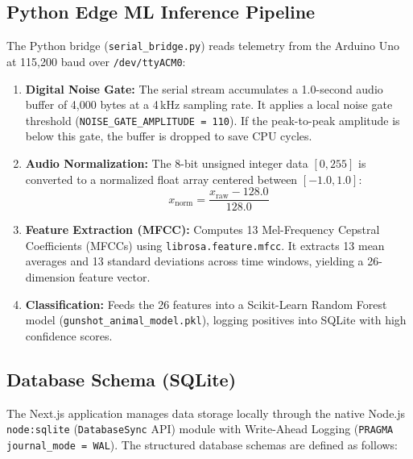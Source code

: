 \documentclass[11pt,a4paper]{article}
\begin{document}
\subsection{Python Edge ML Inference Pipeline}
The Python bridge (\texttt{serial\_bridge.py}) reads telemetry from the Arduino Uno at 115,200 baud over \texttt{/dev/ttyACM0}:
\begin{enumerate}
    \item \textbf{Digital Noise Gate:} The serial stream accumulates a 1.0-second audio buffer of 4,000 bytes at a 4\,kHz sampling rate. It applies a local noise gate threshold (\texttt{NOISE\_GATE\_AMPLITUDE = 110}). If the peak-to-peak amplitude is below this gate, the buffer is dropped to save CPU cycles.
    \item \textbf{Audio Normalization:} The 8-bit unsigned integer data $[0, 255]$ is converted to a normalized float array centered between $[-1.0, 1.0]$:
        \begin{equation}
            x_{\text{norm}} = \frac{x_{\text{raw}} - 128.0}{128.0}
        \end{equation}
    \item \textbf{Feature Extraction (MFCC):} Computes 13 Mel-Frequency Cepstral Coefficients (MFCCs) using \texttt{librosa.feature.mfcc}. It extracts 13 mean averages and 13 standard deviations across time windows, yielding a 26-dimension feature vector.
    \item \textbf{Classification:} Feeds the 26 features into a Scikit-Learn Random Forest model (\texttt{gunshot\_animal\_model.pkl}), logging positives into SQLite with high confidence scores.
\end{enumerate}

\subsection{Database Schema (SQLite)}
The Next.js application manages data storage locally through the native Node.js \texttt{node:sqlite} (\texttt{DatabaseSync} API) module with Write-Ahead Logging (\texttt{PRAGMA journal\_mode = WAL}). The structured database schemas are defined as follows:
\end{document}
